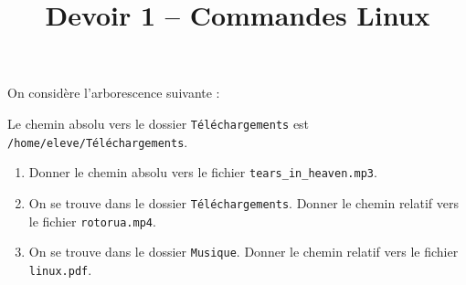 \documentclass[a4paper,dvipsnames]{article}
\title{Devoir 1 -- Commandes Linux}
\author{}
\date{}
\begin{document}
\renewcommand{\contentsname}{}

\pagestyle{fancy}

\begin{tcolorbox}[colframe=blue!75, colback=blue!45, valign=center, height=1.5cm, top=5mm]
  \maketitle
\end{tcolorbox}


\vspace{1cm}

\thispagestyle{fancy}

\begin{exercice}{}{}
  On considère l'arborescence suivante :

  \bigskip


  \bigskip

  Le chemin absolu vers le dossier \texttt{Téléchargements} est \texttt{/home/eleve/Téléchargements}.

  \begin{enumerate}
    \item Donner le chemin absolu vers le fichier \texttt{tears_in_heaven.mp3}.
    \item On se trouve dans le dossier \texttt{Téléchargements}. Donner le chemin relatif vers le fichier \texttt{rotorua.mp4}.
    \item On se trouve dans le dossier \texttt{Musique}. Donner le chemin relatif vers le fichier \texttt{linux.pdf}.
  \end{enumerate}
\end{exercice}

\smallskip
\end{document}
